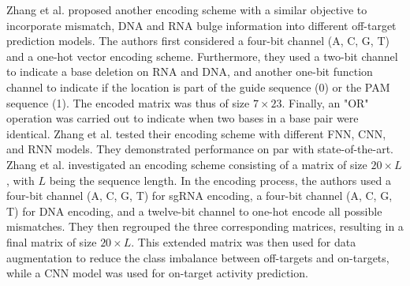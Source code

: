 \documentclass[unnumsec,webpdf,contemporary,large]{oup-authoring-template}
\theoremstyle{thmstyleone}%
\theoremstyle{thmstyletwo}%
\theoremstyle{thmstylethree}%
\begin{document}
Zhang et al. \cite{zhang2022effective} proposed another encoding scheme with a similar objective to incorporate mismatch, DNA and RNA bulge information into different off-target prediction models. The authors first considered a four-bit channel (A, C, G, T) and a one-hot vector encoding scheme. Furthermore, they used a two-bit channel to indicate a base deletion on RNA and DNA, and another one-bit function channel to indicate if the location is part of the guide sequence (0) or the PAM sequence (1). The encoded matrix was thus of size $7\times 23$. Finally, an "OR" operation was carried out to indicate when two bases in a base pair were identical. Zhang et al. tested their encoding scheme with different FNN, CNN, and RNN models. They demonstrated performance on par with state-of-the-art.
Zhang et al. \cite{zhang2020dl} investigated an encoding scheme consisting of a matrix of size $20\times L$, with $L$ being the sequence length. In the encoding process, the authors used a four-bit channel (A, C, G, T) for sgRNA encoding, a four-bit channel (A, C, G, T) for DNA encoding, and a twelve-bit channel to one-hot encode all possible mismatches. They then regrouped the three corresponding matrices, resulting in a final matrix of size $20\times L$. This extended matrix was then used for data augmentation to reduce the class imbalance between off-targets and on-targets, while a CNN model was used for on-target activity prediction.


\end{document}
